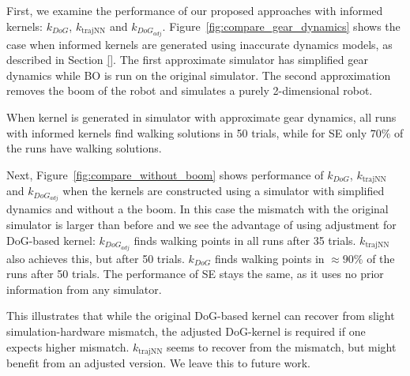 First, we examine the performance of our proposed approaches with informed kernels: $k_{DoG}$, $k_{\text{trajNN}}$ and $k_{DoG_{adj}}$. Figure~\ref{fig:compare_gear_dynamics} shows the case when informed kernels are generated using inaccurate dynamics models, as described in Section \ref{}. The first approximate simulator has simplified gear dynamics while BO is run on the original simulator. The second approximation removes the boom of the robot and simulates a purely 2-dimensional robot.

When kernel is generated in simulator with approximate gear dynamics, all runs with informed kernels find walking solutions in 50 trials, while for SE only $70\%$ of the runs have walking solutions.

Next, Figure~\ref{fig:compare_without_boom} shows performance of $k_{DoG}$, $k_{\text{trajNN}}$ and $k_{DoG_{adj}}$ when the kernels are constructed using a simulator with simplified dynamics and without a the boom. In this case the mismatch with the original simulator is larger than before and we see the advantage of using adjustment for DoG-based kernel: $k_{DoG_{adj}}$ finds walking points in all runs after 35 trials. $k_{\text{trajNN}}$ also achieves this, but after 50 trials. $k_{DoG}$ finds walking points in $\approx\!90\%$ of the runs after 50 trials. The performance of SE stays the same, as it uses no prior information from any simulator.

This illustrates that while the original DoG-based kernel can recover from slight simulation-hardware mismatch, the adjusted DoG-kernel is required if one expects higher mismatch.  $k_{\text{trajNN}}$ seems to recover from the mismatch, but might benefit from an adjusted version. We leave this to future work.


